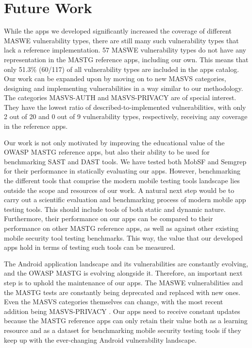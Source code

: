 \chapter{Future Work}
\label{c:future_work}

While the apps we developed significantly increased the coverage of different MASWE vulnerability types, there are still many such vulnerability types that lack a reference implementation. 57 MASWE vulnerability types do not have any representation in the MASTG reference apps, including our own. This means that only 51.3\% (60/117) of all vulnerability types are included in the apps catalog. Our work can be expanded upon by moving on to new MASVS categories, designing and implementing vulnerabilities in a way similar to our methodology. The categories MASVS-AUTH and MASVS-PRIVACY are of special interest. They have the lowest ratio of described-to-implemented vulnerabilities, with only 2 out of 20 and 0 out of 9 vulnerability types, respectively, receiving any coverage in the reference apps.

Our work is not only motivated by improving the educational value of the OWASP MASTG reference apps, but also their ability to be used for benchmarking SAST and DAST tools. We have tested both MobSF and Semgrep for their performance in statically evaluating our apps. However, benchmarking the different tools that comprise the modern mobile testing tools landscape lies outside the scope and resources of our work. A natural next step would be to carry out a scientific evaluation and benchmarking process of modern mobile app testing tools. This should include tools of both static and dynamic nature. Furthermore, their performance on our apps can be compared to their performance on other MASTG reference apps, as well as against other existing mobile security tool testing benchmarks. This way, the value that our developed apps hold in terms of testing such tools can be measured.

The Android application landscape and its vulnerabilities are constantly evolving, and the OWASP MASTG is evolving alongside it. Therefore, an important next step is to uphold the maintenance of our apps. The MASWE vulnerabilities and the MASTG tests are constantly being deprecated and replaced with new ones. Even the MASVS categories themselves can change, with the most recent addition being MASVS-PRIVACY \cite{owasp_introducing_masvs_privacy}. Our apps need to receive constant updates because the MASTG reference apps can only retain their value both as a learning resource and as a dataset for benchmarking mobile security testing tools if they keep up with the ever-changing Android vulnerability landscape.

